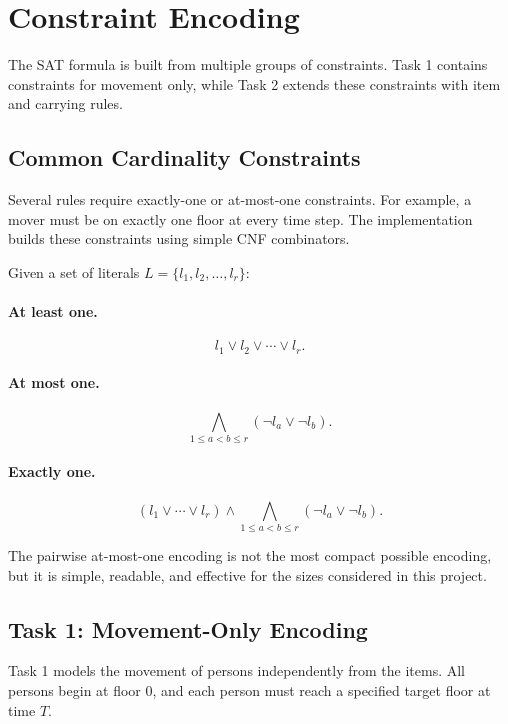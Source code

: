 \section{Constraint Encoding} \label{sec:constraint-encoding}
The SAT formula is built from multiple groups of constraints.
Task 1 contains constraints for movement only, while Task 2 extends these constraints with item and carrying rules.

\subsection{Common Cardinality Constraints} \label{subsec:common-cardinality-constraints}

Several rules require exactly-one or at-most-one constraints.
For example, a mover must be on exactly one floor at every time step.
The implementation builds these constraints using simple CNF combinators.

\noindent Given a set of literals $L = \{l_1, l_2, \ldots, l_r\}$:

\paragraph{At least one.}
\[
    l_1 \lor l_2 \lor \cdots \lor l_r.
\]

\paragraph{At most one.}
\[
    \bigwedge_{1 \leq a < b \leq r} (\neg l_a \lor \neg l_b).
\]

\paragraph{Exactly one.}
\[
    \left(l_1 \lor \cdots \lor l_r\right)
    \land
    \bigwedge_{1 \leq a < b \leq r} (\neg l_a \lor \neg l_b).
\]

\noindent The pairwise at-most-one encoding is not the most compact possible encoding, but it is simple, readable, and effective for the sizes considered in this project.

\subsection{Task 1: Movement-Only Encoding} \label{subsec:task-1:-movement-only-encoding}

Task 1 models the movement of persons independently from the items.
All persons begin at floor $0$, and each person must reach a specified target floor at time $T$.

